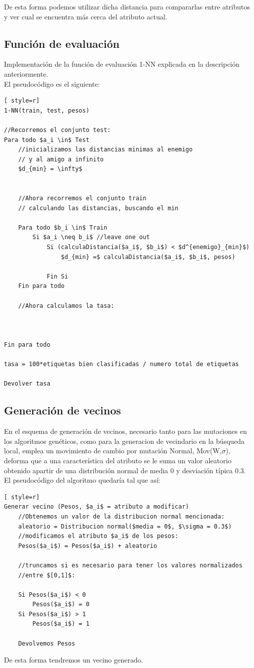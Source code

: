 De esta forma podemos utilizar dicha distancia para compararlas entre atributos y ver cual se encuentra más cerca del atributo actual.

\subsection{Función de evaluación}
Implementación de la función de evaluación 1-NN explicada en la descripción anteriormente.\\ 
El pseudocódigo es el siguiente:

\begin{lstlisting}[ style=r]
1-NN(train, test, pesos)

//Recorremos el conjunto test:
Para todo $a_i \in$ Test
	//inicializamos las distancias minimas al enemigo
	// y al amigo a infinito
	$d_{min} = \infty$

	
	//Ahora recorremos el conjunto train
	// calculando las distancias, buscando el min
	
	Para todo $b_i \in$ Train
		Si $a_i \neq b_i$ //leave one out
			Si (calculaDistancia($a_i$, $b_i$) < $d^{enemigo}_{min}$)
				$d_{min} =$ calculaDistancia($a_i$, $b_i$, pesos)
			
			Fin Si
	Fin para todo
	
	//Ahora calculamos la tasa:
	
	

Fin para todo

tasa = 100*etiquetas bien clasificadas / numero total de etiquetas

Devolver tasa
\end{lstlisting}


\subsection{Generación de vecinos}
En el esquema de generación de vecinos, necesario tanto para las mutaciones en los algoritmos genéticos, como para la generacion de vecindario en la búsqueda local, emplea un movimiento de cambio por mutación Normal, Mov(W,$\sigma$), deforma que a una característica del atributo se le suma un valor aleatorio obtenido apartir de una distribución normal de media 0 y desviación típica 0.3.\\ 

El pseudocódigo del algoritmo quedaría tal que así:

\begin{lstlisting}[ style=r]
Generar vecino (Pesos, $a_i$ = atributo a modificar)
	//Obtenemos un valor de la distribucion normal mencionada:
	aleatorio = Distribucion normal($media = 0$, $\sigma = 0.3$)
	//modificamos el atributo $a_i$ de los pesos:
	Pesos($a_i$) = Pesos($a_i$) + aleatorio
	
	//truncamos si es necesario para tener los valores normalizados 
	//entre $[0,1]$:
	
	Si Pesos($a_i$) < 0
		Pesos($a_i$) = 0
	Si Pesos($a_i$) > 1
		Pesos($a_i$) = 1
		
	Devolvemos Pesos
\end{lstlisting}
De esta forma tendremos un vecino generado.

